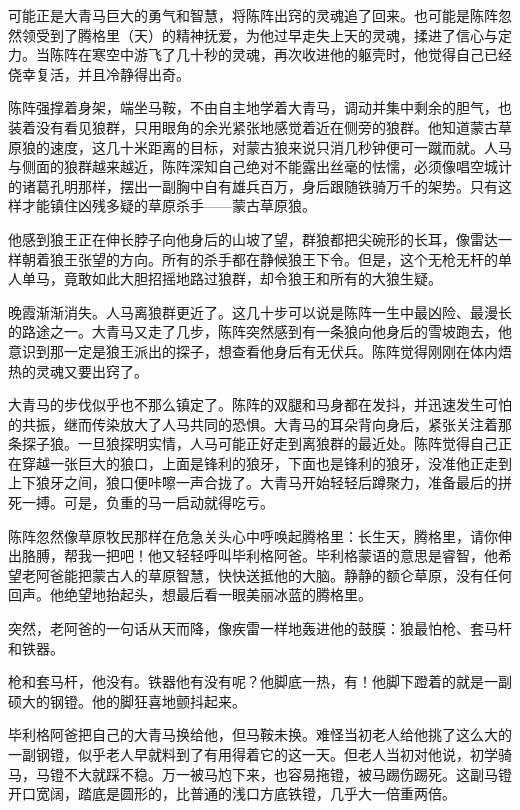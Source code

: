\par 可能正是大青马巨大的勇气和智慧，将陈阵出窍的灵魂追了回来。也可能是陈阵忽然领受到了腾格里（天）的精神抚爱，为他过早走失上天的灵魂，揉进了信心与定力。当陈阵在寒空中游飞了几十秒的灵魂，再次收进他的躯壳时，他觉得自己已经侥幸复活，并且冷静得出奇。
\par 陈阵强撑着身架，端坐马鞍，不由自主地学着大青马，调动并集中剩余的胆气，也装着没有看见狼群，只用眼角的余光紧张地感觉着近在侧旁的狼群。他知道蒙古草原狼的速度，这几十米距离的目标，对蒙古狼来说只消几秒钟便可一蹴而就。人马与侧面的狼群越来越近，陈阵深知自己绝对不能露出丝毫的怯懦，必须像唱空城计的诸葛孔明那样，摆出一副胸中自有雄兵百万，身后跟随铁骑万千的架势。只有这样才能镇住凶残多疑的草原杀手——蒙古草原狼。
\par 他感到狼王正在伸长脖子向他身后的山坡了望，群狼都把尖碗形的长耳，像雷达一样朝着狼王张望的方向。所有的杀手都在静候狼王下令。但是，这个无枪无杆的单人单马，竟敢如此大胆招摇地路过狼群，却令狼王和所有的大狼生疑。
\par 晚霞渐渐消失。人马离狼群更近了。这几十步可以说是陈阵一生中最凶险、最漫长的路途之一。大青马又走了几步，陈阵突然感到有一条狼向他身后的雪坡跑去，他意识到那一定是狼王派出的探子，想查看他身后有无伏兵。陈阵觉得刚刚在体内焐热的灵魂又要出窍了。
\par 大青马的步伐似乎也不那么镇定了。陈阵的双腿和马身都在发抖，并迅速发生可怕的共振，继而传染放大了人马共同的恐惧。大青马的耳朵背向身后，紧张关注着那条探子狼。一旦狼探明实情，人马可能正好走到离狼群的最近处。陈阵觉得自己正在穿越一张巨大的狼口，上面是锋利的狼牙，下面也是锋利的狼牙，没准他正走到上下狼牙之间，狼口便咔嚓一声合拢了。大青马开始轻轻后蹲聚力，准备最后的拼死一搏。可是，负重的马一启动就得吃亏。
\par 陈阵忽然像草原牧民那样在危急关头心中呼唤起腾格里：长生天，腾格里，请你伸出胳膊，帮我一把吧！他又轻轻呼叫毕利格阿爸。毕利格蒙语的意思是睿智，他希望老阿爸能把蒙古人的草原智慧，快快送抵他的大脑。静静的额仑草原，没有任何回声。他绝望地抬起头，想最后看一眼美丽冰蓝的腾格里。
\par 突然，老阿爸的一句话从天而降，像疾雷一样地轰进他的鼓膜：狼最怕枪、套马杆和铁器。
\par 枪和套马杆，他没有。铁器他有没有呢？他脚底一热，有！他脚下蹬着的就是一副硕大的钢镫。他的脚狂喜地颤抖起来。
\par 毕利格阿爸把自己的大青马换给他，但马鞍未换。难怪当初老人给他挑了这么大的一副钢镫，似乎老人早就料到了有用得着它的这一天。但老人当初对他说，初学骑马，马镫不大就踩不稳。万一被马尥下来，也容易拖镫，被马踢伤踢死。这副马镫开口宽阔，踏底是圆形的，比普通的浅口方底铁镫，几乎大一倍重两倍。
